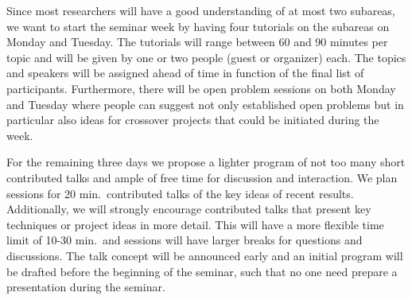 \documentclass[a4paper,10pt]{article}
\newcommand{\NP}{\ensuremath{\mathsf{NP}}\xspace}
\begin{document}
Since most researchers will have a good understanding of at most two subareas, we want to start the seminar week by having four tutorials on the subareas on Monday and Tuesday. The tutorials will range between 60 and 90 minutes per topic and will be given by one or two people (guest or organizer) each. The topics and speakers will be assigned ahead of time in function of the final list of participants. Furthermore, there will be open problem sessions on both Monday and Tuesday where people can suggest not only established open problems but in particular also ideas for crossover projects that could be initiated during the week.

For the remaining three days we propose a lighter program of not too many short contributed talks and ample of free time for discussion and interaction. We plan sessions for 20 min.\ contributed talks of the key ideas of recent results. Additionally, we will strongly encourage contributed talks that present key techniques or project ideas in more detail. This will have a more flexible time limit of 10-30 min.\ and sessions will have larger breaks for questions and discussions. The talk concept will be announced early and an initial program will be drafted before the beginning of the seminar, such that no one need prepare a presentation during the seminar.



% 
\end{document}
